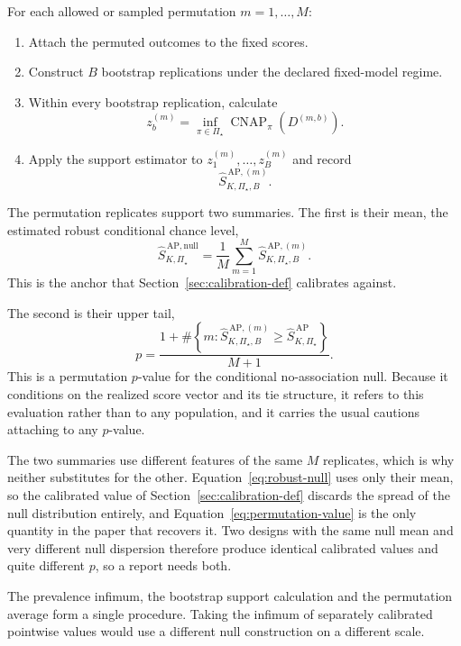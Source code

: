 \documentclass[11pt]{article}
\newcommand{\CNAP}{\operatorname{CNAP}}
\newcommand{\PSet}{\Pi_\star}
\newcommand{\SRobHat}{\widehat S_{K,\PSet}^{\,\mathrm{AP}}}
\newcommand{\SRobNullHat}{\widehat S_{K,\PSet}^{\,\mathrm{AP,null}}}
\theoremstyle{remark}
\begin{document}
For each allowed or sampled permutation $m=1,\ldots,M$:
\begin{enumerate}
\item Attach the permuted outcomes to the fixed scores.
\item Construct $B$ bootstrap replications under the declared fixed-model regime.
\item Within every bootstrap replication, calculate
\[
z_b^{(m)}
=
\inf_{\pi\in\PSet}
\CNAP_\pi(D^{(m,b)}).
\]
\item Apply the support estimator to $z_1^{(m)},\ldots,z_B^{(m)}$ and record
\[
\widehat S_{K,\PSet,B}^{\,\mathrm{AP},(m)}.
\]
\end{enumerate}

The permutation replicates support two summaries. The first is their mean, the estimated robust conditional chance level,
\begin{equation}
\SRobNullHat
=
\frac{1}{M}
\sum_{m=1}^{M}
\widehat S_{K,\PSet,B}^{\,\mathrm{AP},(m)}.
\label{eq:robust-null}
\end{equation}
This is the anchor that Section~\ref{sec:calibration-def} calibrates against.

The second is their upper tail,
\begin{equation}
p
=
\frac{
1+
\#\left\{
m:
\widehat S_{K,\PSet,B}^{\,\mathrm{AP},(m)}
\geq
\SRobHat
\right\}
}{M+1}.
\label{eq:permutation-value}
\end{equation}
This is a permutation $p$-value for the conditional no-association null. Because it conditions on the realized score vector and its tie structure, it refers to this evaluation rather than to any population, and it carries the usual cautions attaching to any $p$-value.

The two summaries use different features of the same $M$ replicates, which is why neither substitutes for the other. Equation~\eqref{eq:robust-null} uses only their mean, so the calibrated value of Section~\ref{sec:calibration-def} discards the spread of the null distribution entirely, and Equation~\eqref{eq:permutation-value} is the only quantity in the paper that recovers it. Two designs with the same null mean and very different null dispersion therefore produce identical calibrated values and quite different $p$, so a report needs both.

The prevalence infimum, the bootstrap support calculation and the permutation average form a single procedure. Taking the infimum of separately calibrated pointwise values would use a different null construction on a different scale.
\end{document}
